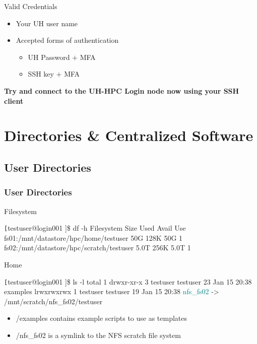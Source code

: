 \begin{frame}
\begin{block}{Valid Credentials}
		\begin{itemize}
			\item Your UH user name
			\item Accepted forms of authentication
			\begin{itemize}\scriptsize
				\item UH Password $+$ MFA 
				\item SSH key $+$ MFA
			\end{itemize}
		\end{itemize}
	\end{block}
	\begin{center}\scriptsize
	\textbf{\large Try and connect to the UH-HPC Login node now using your SSH client}
	\end{center}
\end{frame}

 
\section[Directories \& Centralized Software]{Directories \& Centralized Software }
\subsection{User Directories}
\begin{frame}[fragile]
\frametitle{User Directories}
\begin{block}{Filesystem}
\begin{semiverbatim}\tiny \texttt
[testuser@login001 \ctilde]\$ df -h
Filesystem                                   Size  Used Avail Use%
fs01:/mnt/datastore/hpc/home/testuser         50G  128K   50G   1%
fs02:/mnt/datastore/hpc/scratch/testuser     5.0T  256K  5.0T   1%
\end{semiverbatim}
\end{block}
\begin{block}{Home}
\begin{semiverbatim}\tiny \texttt
[testuser@login001 \ctilde]\$ ls -l 
total 1
drwxr-xr-x 3 testuser testuser 23 Jan 15 20:38 examples
lrwxrwxrwx 1 testuser testuser 19 Jan 15 20:38 \textcolor{teal}{nfs_fs02} -> /mnt/scratch/nfs_fs02/testuser
\end{semiverbatim}
\end{block}
\begin{itemize}
		\item \ctilde{}/examples contains example scripts to use as templates
		\item \ctilde{}/nfs\_fs02 is a symlink to the NFS scratch file system
\end{itemize}
\end{frame}


